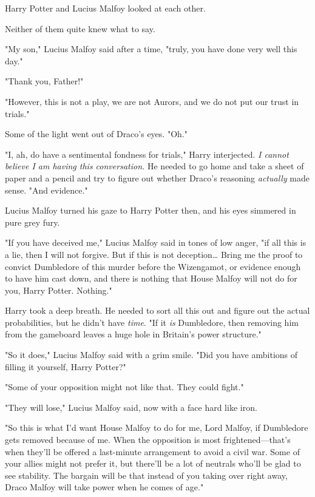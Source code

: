 Harry Potter and Lucius Malfoy looked at each other.

Neither of them quite knew what to say.

"My son," Lucius Malfoy said after a time, "truly, you have done very well this 
day."

"Thank you, Father!"

"However, this is not a play, we are not Aurors, and we do not put our trust in 
trials."

Some of the light went out of Draco's eyes. "Oh."

"I, ah, do have a sentimental fondness for trials," Harry interjected. \emph{I 
cannot believe I am having this conversation.} He needed to go home and take a 
sheet of paper and a pencil and try to figure out whether Draco's reasoning 
\emph{actually} made sense. "And evidence."

Lucius Malfoy turned his gaze to Harry Potter then, and his eyes simmered in 
pure grey fury.

"If you have deceived me," Lucius Malfoy said in tones of low anger, "if all 
this is a lie, then I will not forgive. But if this is not deception{\ldots} 
Bring me the proof to convict Dumbledore of this murder before the Wizengamot, 
or evidence enough to have him cast down, and there is nothing that House 
Malfoy will not do for you, Harry Potter. Nothing."

Harry took a deep breath. He needed to sort all this out and figure out the 
actual probabilities, but he didn't have \emph{time}. "If it \emph{is} 
Dumbledore, then removing him from the gameboard leaves a huge hole in 
Britain's power structure."

"So it does," Lucius Malfoy said with a grim smile. "Did you have ambitions of 
filling it yourself, Harry Potter?"

"Some of your opposition might not like that. They could fight."

"They will lose," Lucius Malfoy said, now with a face hard like iron.

"So this is what I'd want House Malfoy to do for me, Lord Malfoy, if Dumbledore 
gets removed because of me. When the opposition is most frightened---that's 
when they'll be offered a last-minute arrangement to avoid a civil war. Some of 
your allies might not prefer it, but there'll be a lot of neutrals who'll be 
glad to see stability. The bargain will be that instead of you taking over 
right away, Draco Malfoy will take power when he comes of age."

